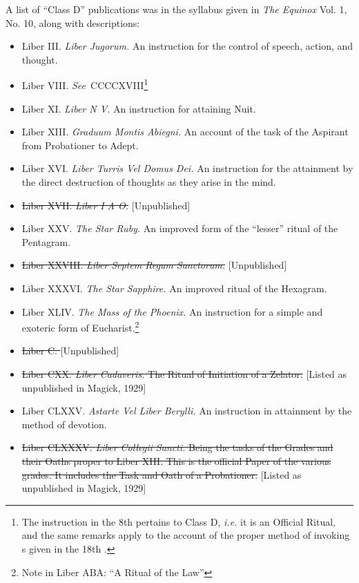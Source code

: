 A list of \enquote{Class D} publications was in the syllabus given in \textit{The Equinox} Vol. 1, No. 10, along with descriptions:

\begin{itemize}
\item Liber III. \textemdash{} \textit{Liber Jugorum.} An instruction for the control of speech, action, and thought.
\item Liber VIII. \textit{See}{}\-\ CCCCXVIII\footnote{The instruction in the 8th \AEthyr{} pertains to Class D, \textit{i.e.} it is an Official Ritual, and the same remarks apply to the account of the proper method of invoking \AEthyr{}s given in the 18th \AEthyr.\footnotemark}
\item Liber XI. \textemdash{} \textit{Liber N V.} An instruction for attaining Nuit.
\item Liber XIII. \textemdash{} \textit{Graduum Montis Abiegni.} An account of the task of the Aspirant from Probationer to Adept.
\item Liber XVI. \textemdash{} \textit{Liber Turris Vel Domus Dei.} An instruction for the attainment by the direct destruction of thoughts as they arise in the mind.
\item \sout{Liber XVII. \textemdash{} \textit{Liber I A O.}} [Unpublished]
\item Liber XXV. \textemdash{} \textit{The Star Ruby.} An improved form of the \enquote{lesser} ritual of the Pentagram.
\item \sout{Liber XXVIII. \textemdash{} \textit{Liber Septem Regum Sanctorum.}} [Unpublished]
\item Liber XXXVI. \textemdash{} \textit{The Star Sapphire.} An improved ritual of the Hexagram.
\item Liber XLIV. \textemdash{} \textit{The Mass of the Phoenix.} An instruction for a simple and exoteric form of Eucharist.\footnote{Note in Liber ABA: \enquote{A Ritual of the Law}}
\item \sout{Liber C. \textemdash{} \textit{}} [Unpublished]
\item \sout{Liber CXX. \textemdash{} \textit{Liber Cadaveris.} The Ritual of Initiation of a Zelator.} [Listed as unpublished in Magick, 1929]
\item Liber CLXXV. \textemdash{} \textit{Astarte Vel Liber Berylli.} An instruction in attainment by the method of devotion.
\item \sout{Liber CLXXXV. \textemdash{} \textit{Liber Collegii Sancti.} Being the tasks of the Grades and their Oaths proper to Liber XIII. This is the official Paper of the various grades. It includes the Task and Oath of a Probationer.} [Listed as unpublished in Magick, 1929]

\end{itemize}
